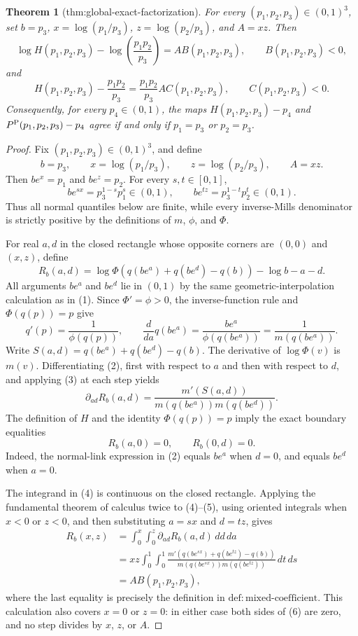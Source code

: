 \documentclass{article}
\newtheorem{theorem}{Theorem}
\begin{document}
\begin{theorem}[thm:global-exact-factorization]\label{thm:global-exact-factorization}
For every \((p_1,p_2,p_3)\in(0,1)^3\), set \(b=p_3\), \(x=\log(p_1/p_3)\), \(z=\log(p_2/p_3)\), and \(A=xz\). Then
\[
\log H(p_1,p_2,p_3)-\log\!\left(\frac{p_1p_2}{p_3}\right)
=A B(p_1,p_2,p_3),
\qquad B(p_1,p_2,p_3)<0,
\]
and
\[
H(p_1,p_2,p_3)-\frac{p_1p_2}{p_3}
=\frac{p_1p_2}{p_3}A C(p_1,p_2,p_3),
\qquad C(p_1,p_2,p_3)<0.
\]
Consequently, for every \(p_4\in(0,1)\), the maps \(H(p_1,p_2,p_3)-p_4\) and \(P^{\rm P}(p_1,p_2,p_3)-p_4\) agree if and only if \(p_1=p_3\) or \(p_2=p_3\).
\end{theorem}
\begin{proof}
Fix \((p_1,p_2,p_3)\in(0,1)^3\), and define
\[
b=p_3,\qquad x=\log(p_1/p_3),\qquad z=\log(p_2/p_3),\qquad A=xz.
\]
Then \(be^x=p_1\) and \(be^z=p_2\).  For every \(s,t\in[0,1]\),
\[
be^{sx}=p_3^{1-s}p_1^s\in(0,1),
\qquad
be^{tz}=p_3^{1-t}p_2^t\in(0,1).
\tag{1}
\]
Thus all normal quantiles below are finite, while every inverse-Mills denominator is strictly positive by the definitions of \(m\), \(\phi\), and \(\Phi\).

For real \(a,d\) in the closed rectangle whose opposite corners are \((0,0)\) and \((x,z)\), define
\[
R_b(a,d)
=\log\Phi\!\left(q(be^a)+q(be^d)-q(b)\right)-\log b-a-d.
\tag{2}
\]
All arguments \(be^a\) and \(be^d\) lie in \((0,1)\) by the same geometric-interpolation calculation as in (1).  Since \(\Phi'=\phi>0\), the inverse-function rule and \(\Phi(q(p))=p\) give
\[
q'(p)=\frac{1}{\phi(q(p))},
\qquad
\frac{d}{da}q(be^a)
=\frac{be^a}{\phi(q(be^a))}
=\frac{1}{m(q(be^a))}.
\tag{3}
\]
Write \(S(a,d)=q(be^a)+q(be^d)-q(b)\).  The derivative of \(\log\Phi(v)\) is \(m(v)\).  Differentiating (2), first with respect to \(a\) and then with respect to \(d\), and applying (3) at each step yields
\[
\partial_{ad}R_b(a,d)
=\frac{m'(S(a,d))}
{m(q(be^a))m(q(be^d))}.
\tag{4}
\]
The definition of \(H\) and the identity \(\Phi(q(p))=p\) imply the exact boundary equalities
\[
R_b(a,0)=0,
\qquad
R_b(0,d)=0.
\tag{5}
\]
Indeed, the normal-link expression in (2) equals \(be^a\) when \(d=0\), and equals \(be^d\) when \(a=0\).

The integrand in (4) is continuous on the closed rectangle.  Applying the fundamental theorem of calculus twice to (4)--(5), using oriented integrals when \(x<0\) or \(z<0\), and then substituting \(a=sx\) and \(d=tz\), gives
\[
\begin{aligned}
R_b(x,z)
&=\int_0^x\!\int_0^z \partial_{ad}R_b(a,d)\,dd\,da\\
&=xz\int_0^1\!\int_0^1
\frac{m'\!\left(q(be^{sx})+q(be^{tz})-q(b)\right)}
{m(q(be^{sx}))m(q(be^{tz}))}\,dt\,ds\\
&=A B(p_1,p_2,p_3),
\end{aligned}
\tag{6}
\]
where the last equality is precisely the definition in \(\mathrm{def{:}mixed\text{-}coefficient}\).  This calculation also covers \(x=0\) or \(z=0\): in either case both sides of (6) are zero, and no step divides by \(x\), \(z\), or \(A\).


\end{proof}
\end{document}
